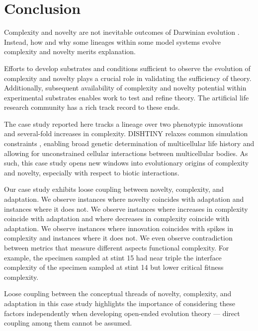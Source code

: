 \section{Conclusion}

Complexity and novelty are not inevitable outcomes of Darwinian evolution \citep{stanley2017open}.
Instead, how and why some lineages within some model systems evolve complexity and novelty merits explanation.

Efforts to develop substrates and conditions sufficient to observe the evolution of complexity and novelty plays a crucial role in validating the sufficiency of theory.
Additionally, subsequent availability of complexity and novelty potential within experimental substrates enables work to test and refine theory.
The artificial life research community has a rich track record to these ends.

The case study reported here tracks a lineage over two phenotypic innovations and several-fold increases in complexity.
DISHTINY relaxes common simulation constraints \citep{goldsby2012task, goldsby2014evolutionary}, enabling broad genetic determination of multicellular life history and allowing for unconstrained cellular interactions between multicellular bodies.
As such, this case study opens new windows into evolutionary origins of complexity and novelty, especially with respect to biotic interactions.

Our case study exhibits loose coupling between novelty, complexity, and adaptation.
We observe instances where novelty coincides with adaptation and instances where it does not.
We observe instances where increases in complexity coincide with adaptation and where decreases in complexity coincide with adaptation.
We observe instances where innovation coincides with spikes in complexity and instances where it does not.
We even observe contradiction between metrics that measure different aspects functional complexity.
For example, the specimen sampled at stint 15 had near triple the interface complexity of the specimen sampled at stint 14 but lower critical fitness complexity.

Loose coupling between the conceptual threads of novelty, complexity, and adaptation in this case study highlights the importance of considering these factors independently when developing open-ended evolution theory --- direct coupling among them cannot be assumed.

